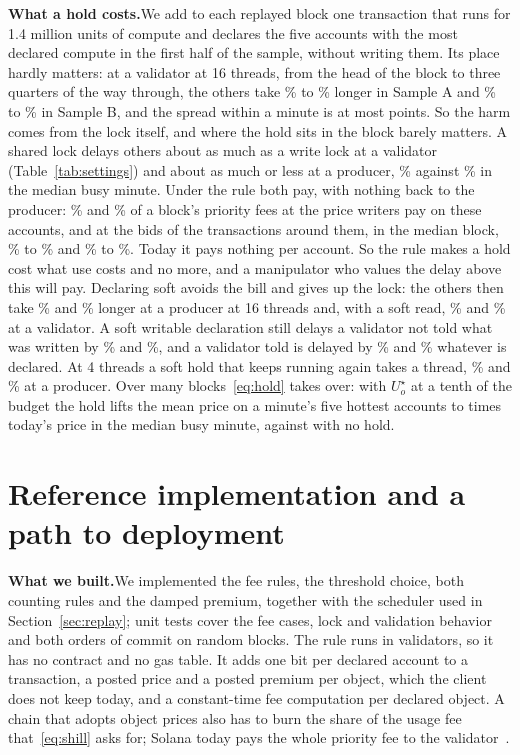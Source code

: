 \documentclass[conference,compsoc]{IEEEtran}
\numberwithin{equation}{section}
\theoremstyle{plain}
\theoremstyle{definition}
\theoremstyle{remark}
\newcommand{\runin}[1]{\par\smallskip\noindent\textbf{#1.}\enspace}
\begin{document}
\runin{What a hold costs}We add to each replayed block one transaction that runs for 1.4 million units of compute and declares the five accounts with the most declared compute in the first half of the sample, without writing them. Its place hardly matters: at a validator at 16 threads, from the head of the block to three quarters of the way through, the others take \placeBlockLoA\% to \placeBlockHiA\% longer in Sample A and \placeBlockLoB\% to \placeBlockHiB\% in Sample B, and the spread within a minute is at most \placeSpreadAll{} points. So the harm comes from the lock itself, and where the hold sits in the block barely matters. A shared lock delays others about as much as a write lock at a validator (Table~\ref{tab:settings}) and about as much or less at a producer, \winHoldFreeReadSixteenMed\% against \winHoldFreeFirmSixteenMed\% in the median busy minute. Under the rule both pay, with nothing back to the producer: \billWritersShareA\% and \billWritersShareB\% of a block's priority fees at the price writers pay on these accounts, and at the bids of the transactions around them, in the median block, \billLocalLoA\% to \billLocalHiA\% and \billLocalLoB\% to \billLocalHiB\%. Today it pays nothing per account. So the rule makes a hold cost what use costs and no more, and a manipulator who values the delay above this will pay. Declaring soft avoids the bill and gives up the lock: the others then take \holdFreeSoftSixteenA\% and \holdFreeSoftSixteenB\% longer at a producer at 16 threads and, with a soft read, \holdBlockSoftReadSixteenA\% and \holdBlockSoftReadSixteenB\% at a validator. A soft writable declaration still delays a validator not told what was written by \holdBlockSoftSixteenA\% and \holdBlockSoftSixteenB\%, and a validator told is delayed by \holdToldSixteenA\% and \holdToldSixteenB\% whatever is declared. At 4 threads a soft hold that keeps running again takes a thread, \holdFreeSoftFourA\% and \holdFreeSoftFourB\% at a producer. Over many blocks~\eqref{eq:hold} takes over: with $U^\star_o$ at a tenth of the budget the hold lifts the mean price on a minute's five hottest accounts to \winPathHoldTenthMed{} times today's price in the median busy minute, against \winPathFreeTenthMed{} with no hold.

\section{Reference implementation and a path to deployment}\label{sec:prototype}

\runin{What we built}We implemented the fee rules, the threshold choice, both counting rules and the damped premium, together with the scheduler used in Section~\ref{sec:replay}; \nTests{} unit tests cover the fee cases, lock and validation behavior and both orders of commit on random blocks. The rule runs in validators, so it has no contract and no gas table. It adds one bit per declared account to a transaction, a posted price and a posted premium per object, which the client does not keep today, and a constant-time fee computation per declared object. A chain that adopts object prices also has to burn the share of the usage fee that~\eqref{eq:shill} asks for; Solana today pays the whole priority fee to the validator~\cite{simd0096}.
\end{document}
